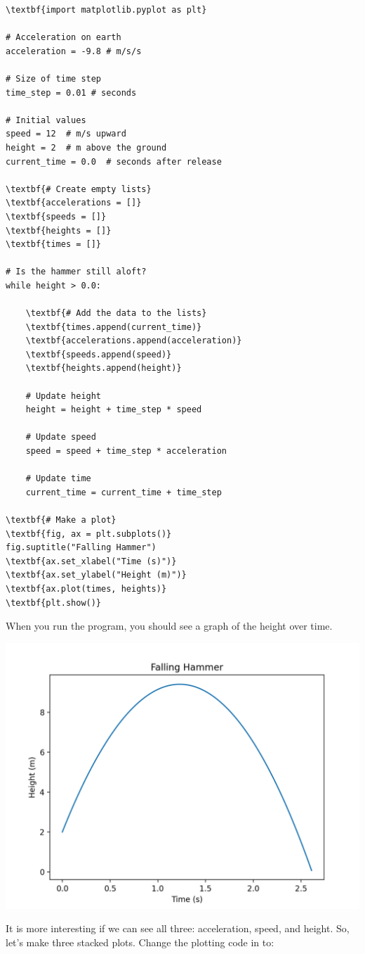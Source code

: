 \begin{Verbatim}[commandchars=\\\{\}]
\textbf{import matplotlib.pyplot as plt}

# Acceleration on earth
acceleration = -9.8 # m/s/s

# Size of time step
time_step = 0.01 # seconds

# Initial values
speed = 12  # m/s upward
height = 2  # m above the ground
current_time = 0.0  # seconds after release

\textbf{# Create empty lists}
\textbf{accelerations = []}
\textbf{speeds = []}
\textbf{heights = []}
\textbf{times = []}

# Is the hammer still aloft?
while height > 0.0:

    \textbf{# Add the data to the lists}
    \textbf{times.append(current_time)}
    \textbf{accelerations.append(acceleration)}
    \textbf{speeds.append(speed)}
    \textbf{heights.append(height)}
    
    # Update height
    height = height + time_step * speed

    # Update speed
    speed = speed + time_step * acceleration

    # Update time
    current_time = current_time + time_step

\textbf{# Make a plot}
\textbf{fig, ax = plt.subplots()}
fig.suptitle("Falling Hammer")
\textbf{ax.set_xlabel("Time (s)")}
\textbf{ax.set_ylabel("Height (m)")}
\textbf{ax.plot(times, heights)}
\textbf{plt.show()}
\end{Verbatim}

When you run the program, you should see a graph of the height over time.

\includegraphics[width=0.7\linewidth]{heightplot.png}

It is more interesting if we can see all three: acceleration, speed, and height. 
So, let's make three stacked plots. Change the plotting code in  to:

